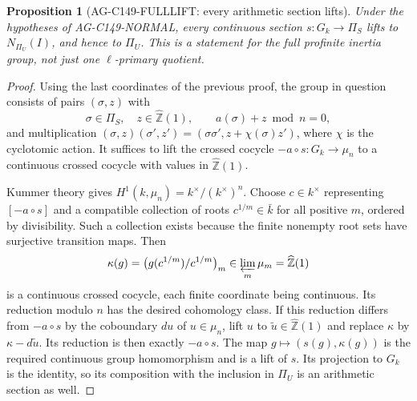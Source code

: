 \documentclass[11pt,a4paper]{article}
\newtheorem{proposition}{Proposition}
\begin{document}
\begin{proposition}[AG-C149-FULLLIFT: every arithmetic section lifts]
Under the hypotheses of AG-C149-NORMAL, every continuous section
$s:G_k\to\Pi_S$ lifts to $N_{\Pi_U}(I)$, and hence to $\Pi_U$.
This is a statement for the full profinite inertia group,
not just one $\ell$-primary quotient.
\end{proposition}
\begin{proof}
Using the last coordinates of the previous proof, the group in
question consists of pairs $(\sigma,z)$ with
\[
 \sigma\in\Pi_S,\quad z\in\widehat{\mathbb Z}(1),\qquad
 a(\sigma)+z\bmod n=0,
\]
and multiplication
$(\sigma,z)(\sigma',z')=(\sigma\sigma',z+\chi(\sigma)z')$,
where $\chi$ is the cyclotomic action. It suffices to lift the
crossed cocycle $-a\circ s:G_k\to\mu_n$ to a continuous
crossed cocycle with values in $\widehat{\mathbb Z}(1)$.

Kummer theory gives $H^1(k,\mu_n)=k^\times/(k^\times)^n$.
Choose $c\in k^\times$ representing $[-a\circ s]$ and a
compatible collection of roots $c^{1/m}\in\bar k$ for all
positive $m$, ordered by divisibility. Such a collection exists
because the finite nonempty root sets have surjective transition
maps. Then
\[
 \kappa(g)=\bigl(g(c^{1/m})/c^{1/m}\bigr)_m
       \in\varprojlim_m\mu_m=\widehat{\mathbb Z}(1)
\]
is a continuous crossed cocycle, each finite coordinate being
continuous. Its reduction modulo $n$ has the desired cohomology
class. If this reduction differs from $-a\circ s$ by the
coboundary $du$ of $u\in\mu_n$, lift $u$ to
$\tilde u\in\widehat{\mathbb Z}(1)$ and replace $\kappa$ by
$\kappa-d\tilde u$. Its reduction is then exactly $-a\circ s$.
The map $g\mapsto(s(g),\kappa(g))$ is the required continuous
group homomorphism and is a lift of $s$. Its projection to $G_k$
is the identity, so its composition with the inclusion in
$\Pi_U$ is an arithmetic section as well.
\end{proof}
\end{document}
